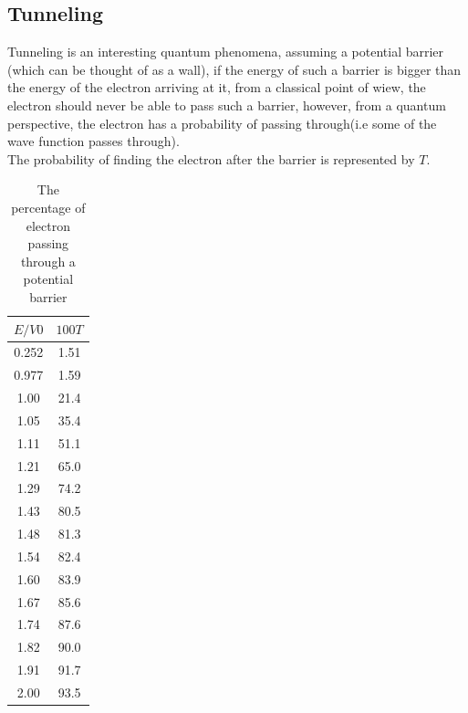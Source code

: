 \documentclass[10pt, a4paper]{article}
\begin{document}
\begin{adjustwidth}{1cm}{}
\subsection{Tunneling}
Tunneling is an interesting quantum phenomena, assuming a potential barrier (which can be thought of as a wall), if the energy of such a barrier is bigger than the energy of the electron arriving at it, from a classical point of wiew, the electron should never be able to pass such a barrier, however, from a quantum perspective, the electron has a probability of passing through(i.e some of the wave function passes through).\\
\newpage
The probability of finding the electron after the barrier is represented by $T$.\\
\begin{table}[H]
    \centering
    \begin{tabular}{|c|c|}
    \hline
     $E/V0$& $100T$\\ \hline
    0.252& 1.51     \\ \hline
    0.977&  1.59     \\ \hline
    1.00& 21.4        \\ \hline
    1.05& 35.4         \\ \hline
    1.11& 51.1          \\ \hline
    1.21& 65.0           \\ \hline
    1.29& 74.2            \\ \hline
    1.43& 80.5             \\ \hline
    1.48& 81.3              \\ \hline
    1.54& 82.4               \\ \hline
    1.60& 83.9                \\ \hline
    1.67& 85.6                 \\ \hline
    1.74& 87.6                  \\ \hline
    1.82& 90.0                   \\ \hline
    1.91& 91.7                    \\ \hline
    2.00& 93.5                     \\ \hline
    \end{tabular}
    \caption{The percentage of electron passing through a potential barrier}
    \label{tab:my_label}
\end{table}


\end{adjustwidth}
\end{document}
